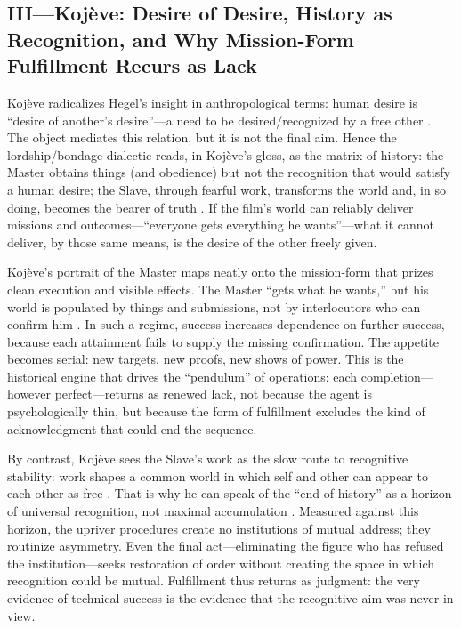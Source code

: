 \subsection*{III—Koj{\`e}ve: Desire of Desire, History as Recognition, and Why Mission-Form
Fulfillment Recurs as Lack}
\label{ssec:iii-kojeve}
Koj{\`e}ve radicalizes Hegel's insight in anthropological terms: human desire is ``desire of
another's desire''—a need to be desired/recognized by a free other \parencite[p.~6]{KojeveIRH1980}.
The object mediates this relation, but it is not the final aim. Hence the lordship/bondage
dialectic reads, in Koj{\`e}ve's gloss, as the matrix of history: the Master obtains things
(and obedience) but not the recognition that would satisfy a human desire; the Slave, through
fearful work, transforms the world and, in so doing, becomes the bearer of truth
\parencite[pp.~27--34, 158--164]{KojeveIRH1980}. If the film's world can reliably deliver
missions and outcomes—``everyone gets everything he wants''—what it cannot deliver, by those
same means, is the desire of the other freely given.

Koj{\`e}ve's portrait of the Master maps neatly onto the mission-form that prizes clean
execution and visible effects. The Master ``gets what he wants,'' but his world is populated by
things and submissions, not by interlocutors who can confirm him
\parencite[pp.~27--34]{KojeveIRH1980}. In such a regime, success increases dependence on further
success, because each attainment fails to supply the missing confirmation. The appetite becomes
serial: new targets, new proofs, new shows of power. This is the historical engine that drives
the ``pendulum'' of operations: each completion—however perfect—returns as renewed lack, not
because the agent is psychologically thin, but because the form of fulfillment excludes the kind
of acknowledgment that could end the sequence.

By contrast, Koj{\`e}ve sees the Slave's work as the slow route to recognitive stability: work
shapes a common world in which self and other can appear to each other as free
\parencite[pp.~158--164]{KojeveIRH1980}. That is why he can speak of the ``end of history'' as
a horizon of universal recognition, not maximal accumulation
\parencite[pp.~158--164]{KojeveIRH1980}. Measured against this horizon, the upriver procedures
create no institutions of mutual address; they routinize asymmetry. Even the final act—eliminating
the figure who has refused the institution—seeks restoration of order without creating the space
in which recognition could be mutual. Fulfillment thus returns as judgment: the very evidence of
technical success is the evidence that the recognitive aim was never in view.

